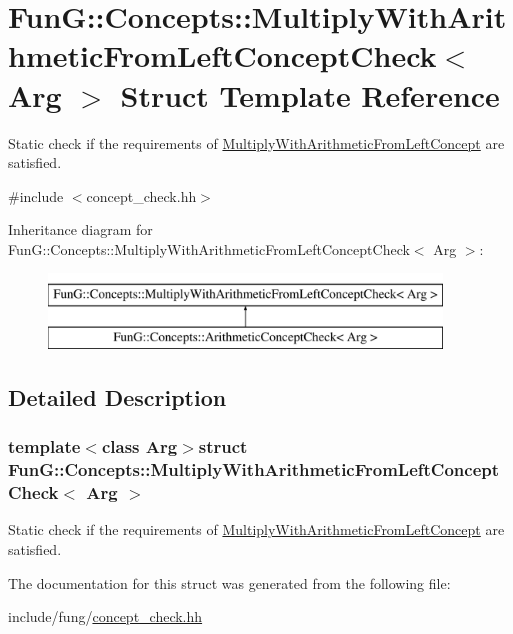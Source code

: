 \hypertarget{structFunG_1_1Concepts_1_1MultiplyWithArithmeticFromLeftConceptCheck}{\section{Fun\-G\-:\-:Concepts\-:\-:Multiply\-With\-Arithmetic\-From\-Left\-Concept\-Check$<$ Arg $>$ Struct Template Reference}
\label{structFunG_1_1Concepts_1_1MultiplyWithArithmeticFromLeftConceptCheck}
}


Static check if the requirements of \hyperlink{structFunG_1_1Concepts_1_1MultiplyWithArithmeticFromLeftConcept}{Multiply\-With\-Arithmetic\-From\-Left\-Concept} are satisfied.  




{\ttfamily \#include $<$concept\-\_\-check.\-hh$>$}

Inheritance diagram for Fun\-G\-:\-:Concepts\-:\-:Multiply\-With\-Arithmetic\-From\-Left\-Concept\-Check$<$ Arg $>$\-:\begin{figure}[H]
\begin{center}
\leavevmode
\includegraphics[height=2.000000cm]{structFunG_1_1Concepts_1_1MultiplyWithArithmeticFromLeftConceptCheck}
\end{center}
\end{figure}


\subsection{Detailed Description}
\subsubsection*{template$<$class Arg$>$struct Fun\-G\-::\-Concepts\-::\-Multiply\-With\-Arithmetic\-From\-Left\-Concept\-Check$<$ Arg $>$}

Static check if the requirements of \hyperlink{structFunG_1_1Concepts_1_1MultiplyWithArithmeticFromLeftConcept}{Multiply\-With\-Arithmetic\-From\-Left\-Concept} are satisfied. 

The documentation for this struct was generated from the following file\-:\begin{DoxyCompactItemize}
\item 
include/fung/\hyperlink{concept__check_8hh}{concept\-\_\-check.\-hh}\end{DoxyCompactItemize}
